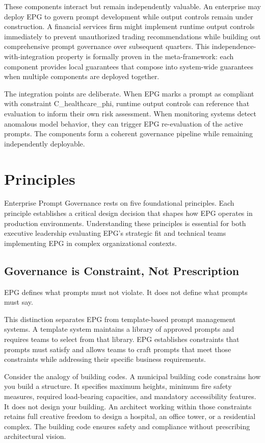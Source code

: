 These components interact but remain independently valuable. An enterprise may deploy EPG to govern prompt development while output controls remain under construction. A financial services firm might implement runtime output controls immediately to prevent unauthorized trading recommendations while building out comprehensive prompt governance over subsequent quarters. This independence-with-integration property is formally proven in the meta-framework: each component provides local guarantees that compose into system-wide guarantees when multiple components are deployed together.

The integration points are deliberate. When EPG marks a prompt as compliant with constraint C\_\allowbreak{}healthcare\_\allowbreak{}phi, runtime output controls can reference that evaluation to inform their own risk assessment. When monitoring systems detect anomalous model behavior, they can trigger EPG re-evaluation of the active prompts. The components form a coherent governance pipeline while remaining independently deployable.



\section{Principles}
\label{sec:prompt-2}


Enterprise Prompt Governance rests on five foundational principles. Each principle establishes a critical design decision that shapes how EPG operates in production environments. Understanding these principles is essential for both executive leadership evaluating EPG's strategic fit and technical teams implementing EPG in complex organizational contexts.

\subsection{Governance is Constraint, Not Prescription}


EPG defines what prompts must not violate. It does not define what prompts must say.

This distinction separates EPG from template-based prompt management systems. A template system maintains a library of approved prompts and requires teams to select from that library. EPG establishes constraints that prompts must satisfy and allows teams to craft prompts that meet those constraints while addressing their specific business requirements.

Consider the analogy of building codes. A municipal building code constrains how you build a structure. It specifies maximum heights, minimum fire safety measures, required load-bearing capacities, and mandatory accessibility features. It does not design your building. An architect working within those constraints retains full creative freedom to design a hospital, an office tower, or a residential complex. The building code ensures safety and compliance without prescribing architectural vision.

